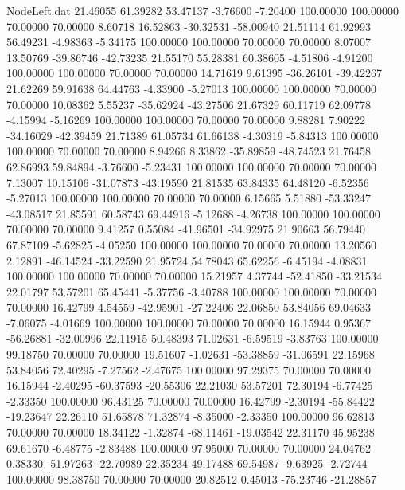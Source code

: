 \begin{filecontents}{NodeLeft.dat}
  21.46055   61.39282   53.47137    -3.76600   -7.20400  100.00000  100.00000   70.00000   70.00000    8.60718   16.52863  -30.32531  -58.00940
  21.51114   61.92993   56.49231    -4.98363   -5.34175  100.00000  100.00000   70.00000   70.00000    8.07007   13.50769  -39.86746  -42.73235
  21.55170   55.28381   60.38605    -4.51806   -4.91200  100.00000  100.00000   70.00000   70.00000   14.71619    9.61395  -36.26101  -39.42267
  21.62269   59.91638   64.44763    -4.33900   -5.27013  100.00000  100.00000   70.00000   70.00000   10.08362    5.55237  -35.62924  -43.27506
  21.67329   60.11719   62.09778    -4.15994   -5.16269  100.00000  100.00000   70.00000   70.00000    9.88281    7.90222  -34.16029  -42.39459
  21.71389   61.05734   61.66138    -4.30319   -5.84313  100.00000  100.00000   70.00000   70.00000    8.94266    8.33862  -35.89859  -48.74523
  21.76458   62.86993   59.84894    -3.76600   -5.23431  100.00000  100.00000   70.00000   70.00000    7.13007   10.15106  -31.07873  -43.19590
  21.81535   63.84335   64.48120    -6.52356   -5.27013  100.00000  100.00000   70.00000   70.00000    6.15665    5.51880  -53.33247  -43.08517
  21.85591   60.58743   69.44916    -5.12688   -4.26738  100.00000  100.00000   70.00000   70.00000    9.41257    0.55084  -41.96501  -34.92975
  21.90663   56.79440   67.87109    -5.62825   -4.05250  100.00000  100.00000   70.00000   70.00000   13.20560    2.12891  -46.14524  -33.22590
  21.95724   54.78043   65.62256    -6.45194   -4.08831  100.00000  100.00000   70.00000   70.00000   15.21957    4.37744  -52.41850  -33.21534
  22.01797   53.57201   65.45441    -5.37756   -3.40788  100.00000  100.00000   70.00000   70.00000   16.42799    4.54559  -42.95901  -27.22406
  22.06850   53.84056   69.04633    -7.06075   -4.01669  100.00000  100.00000   70.00000   70.00000   16.15944    0.95367  -56.26881  -32.00996
  22.11915   50.48393   71.02631    -6.59519   -3.83763  100.00000   99.18750   70.00000   70.00000   19.51607   -1.02631  -53.38859  -31.06591
  22.15968   53.84056   72.40295    -7.27562   -2.47675  100.00000   97.29375   70.00000   70.00000   16.15944   -2.40295  -60.37593  -20.55306
  22.21030   53.57201   72.30194    -6.77425   -2.33350  100.00000   96.43125   70.00000   70.00000   16.42799   -2.30194  -55.84422  -19.23647
  22.26110   51.65878   71.32874    -8.35000   -2.33350  100.00000   96.62813   70.00000   70.00000   18.34122   -1.32874  -68.11461  -19.03542
  22.31170   45.95238   69.61670    -6.48775   -2.83488  100.00000   97.95000   70.00000   70.00000   24.04762    0.38330  -51.97263  -22.70989
  22.35234   49.17488   69.54987    -9.63925   -2.72744  100.00000   98.38750   70.00000   70.00000   20.82512    0.45013  -75.23746  -21.28857

\end{filecontents}
